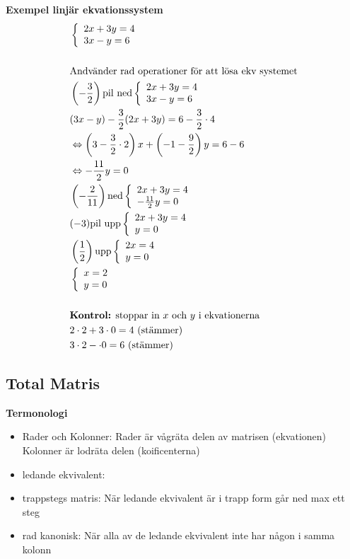 \begin{multicols}{2}
\textbf{Exempel linjär ekvationssystem}
\begin{align*}
  &\left\{\begin{array}{l}
  2x+3y=4 \\
  3x-y=6
  \end{array}\right. \\
  &\\
  &\text{Andvänder rad operationer för att lösa ekv systemet} \\
  &\left(-\frac{3}{2}\right) \text{pil ned} \left\{\begin{array}{l}
  2x+3y=4 \\
  3x-y=6
  \end{array}\right. \\
  &(3x-y) -\frac{3}{2} (2x+3y)=6 -\frac{3}{2} \cdot 4 \\
  &\Leftrightarrow
  \left(3-\frac{3}{2}\cdot 2\right) x + \left(-1 -\frac{9}{2}\right) y = 6 -6\\
  &\Leftrightarrow-\frac{11}{2}y = 0 \\
  &\left(-\frac{2}{11}\right) \text{ned} \left\{\begin{array}{l}
  2x+3y=4 \\
  -\frac{11}{2}y = 0
  \end{array}\right. \\
  &(-3)\text{pil upp}\left\{\begin{array}{l}
  2x+3y=4 \\
  y=0
  \end{array}\right. \\
  &\left(\frac{1}{2}\right)\text{upp}\left\{\begin{array}{l}
  2x=4 \\
  y=0
  \end{array}\right. \\
  &\left\{\begin{array}{l}
  x=2 \\
  y=0
  \end{array}\right. \\
  &\\
  &\text{\textbf{Kontrol:} stoppar in $x$ och $y$ i ekvationerna} \\
  &2\cdot{2}+3\cdot{0}=4 \text{ (stämmer)} \\
  &3\cdot{2}-\cdot{0}=6 \text{ (stämmer)} \\
\end{align*}


\subsection{Total Matris}
\textbf{Termonologi}
\begin{itemize}
  \item Rader och Kolonner: Rader är vågräta delen av matrisen (ekvationen)
    Kolonner är lodräta delen (koificenterna)
  \item ledande ekvivalent: 
  \item trappstegs matris: När ledande ekvivalent är i trapp form går ned max ett steg
  \item rad kanonisk: När alla av de ledande ekvivalent inte har någon i samma kolonn
\end{itemize}
  

\end{multicols}
